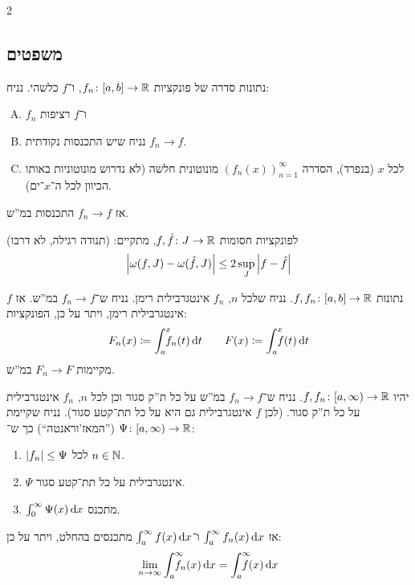 \documentclass[]{../../../tex/classes/styledArticle}
\begin{document}
\begin{multicols}{2}
		\subsection{משפטים}
			\begin{Theorem}
				נתונות סדרה של פונקציות $f_n \colon [a, b] \to \mathbb{R}$, ו־$f$ כלשהי. נניח:
				\begin{enumerate}[(A)]
					\item $f_n$ ו־$f$ רציפות
					\item נניח שיש התכנסות נקודתית $f_n \to f$.
					\item לכל $x$ (בנפרד), הסדרה $(f_n(x))_{n = 1}^{\infty}$ מונוטונית חלשה (לא נדרוש מונוטוניות באותו הכיוון לכל ה־$x$־ים).
				\end{enumerate}
				אז $f_n \to f$ התכנסות במ''ש.
			\end{Theorem}
			\begin{Lemma}
				לפונקציות חסומות $f, \hat f \colon J \to \mathbb{R}$, מתקיים: (תנודה רגילה, לא דרבו)
				\[ \left \lvert \omega(f, J) - \omega(\hat f, J) \right \rvert \le 2 \sup_J \left \lvert f - \hat f \right \rvert \]
			\end{Lemma}
			\begin{Theorem}
				נתונות $f, f_n \colon [a, b] \to \mathbb{R}$. נניח שלכל $n$, $f_n$ אינטגרבילית רימן. נניח ש־$f_n \to f$ במ''ש. אז $f$ אינטגרבילית רימן, ויתר על כן, הפונקציות:
				\[ F_n(x) \cod \int^{x}_a \dequad \ f_n(t)\dt \quad \quad F(x) \cod \int^{x}_a \dequad \ f(t)\dt \]
				מקיימות $F_n \to F$ במ''ש.
			\end{Theorem}
			\begin{Theorem}
				יהיו $f, f_n \colon [a, \infty) \to \mathbb{R}$. נניח ש־$f_n \to f$ במ''ש על כל ת''ק סגור וכן לכל $n$, $f_n$ אינטגרבילית על כל ת''ק סגור. (לכן $f$ אינטגרבילית גם היא על כל תת־קטע סגור). נניח שקיימת $\Psi \colon [a, \infty) \to \mathbb{R}$ (''המאז'וראנטה``) כך ש־:
				\begin{enumerate}
					\item $\left \lvert f_n \right \rvert \le \Psi$ לכל $n \in \mathbb{N}$.
					\item $\Psi$ אינטגרבילית על כל תת־קטע סגור.
					\item $\int^{\infty}_0 \Psi(x)\,\mathrm{d}x$ מתכנס.
				\end{enumerate}
				אז $\int^{\infty}_a f_n(x)\,\mathrm{d}x$ ו־$\int^{\infty}_a f(x)\,\mathrm{d}x$ מתכנסים בהחלט, ויתר על כן:
				\[ \lim_{n \to \infty}\int^{\infty}_a \dequad f_n(x)\dx = \int^{\infty}_a\dequad f(x)\dx \]
			\end{Theorem}
			

\end{multicols}
\end{document}
